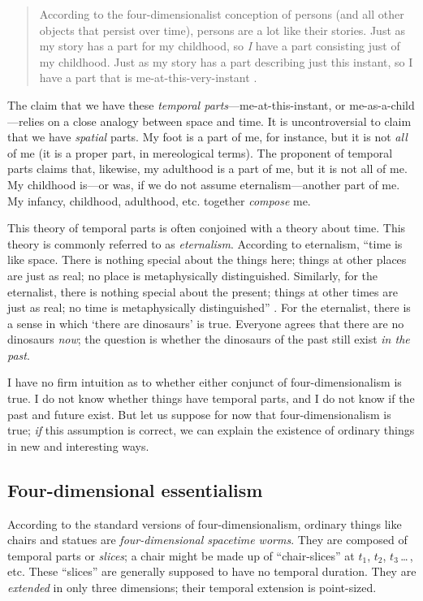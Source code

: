 \documentclass[12pt,twoside]{reedfancy}
\begin{document}
\begin{spacing}{1.25}
\begin{quote}
According to the four-dimensionalist conception of persons (and all
other objects that persist over time), persons are a lot like their
stories.  Just as my story has a part for my childhood, so {\em I}
have a part consisting just of my childhood.  Just as my story has a
part describing just this instant, so I have a part that is
me-at-this-very-instant \citeyearpar[1]{sider2001}.
\end{quote}

The claim that we have these {\em temporal
  parts}---me-at-this-instant, or me-as-a-child---relies on a close
analogy between space and time.  It is uncontroversial to claim that
we have {\em spatial} parts.  My foot is a part of me, for instance,
but it is not {\em all} of me (it is a proper part, in mereological
terms).  The proponent of temporal parts claims that, likewise, my
adulthood is a part of me, but it is not all of me.  My childhood
is---or was, if we do not assume eternalism---another part of me.  My
infancy, childhood, adulthood, etc. together {\em compose} me.

This theory of temporal parts is often conjoined with a theory about
time.  This theory is commonly referred to as {\em eternalism}.
According to eternalism, ``time is like space.  There is nothing
special about the things here; things at other places are just as
real; no place is metaphysically distinguished.  Similarly, for the
eternalist, there is nothing special about the present; things at
other times are just as real; no time is metaphysically
distinguished'' \citep[122]{hinchliff1996}.  For the eternalist, there
is a sense in which `there are dinosaurs' is true.  Everyone agrees
that there are no dinosaurs {\em now}; the question is whether the
dinosaurs of the past still exist {\em in the past}.

I have no firm intuition as to whether either conjunct of
four-dimensionalism is true.  I do not know whether things have
temporal parts, and I do not know if the past and future exist.  But
let us suppose for now that four-dimensionalism is true; {\em if} this
assumption is correct, we can explain the existence of ordinary things
in new and interesting ways.

\subsection{Four-dimensional essentialism}
\label{4de}
According to the standard versions of four-dimensionalism, ordinary
things like chairs and statues are {\em four-dimensional spacetime
  worms}.  They are composed of temporal parts or {\em slices}; a
chair might be made up of ``chair-slices'' at $t_{1}$, $t_{2}$,
$t_{3}$\,\ldots\,, etc.  These ``slices'' are generally supposed to
have no temporal duration.  They are {\em extended} in only three
dimensions; their temporal extension is point-sized.


\end{spacing}
\end{document}
